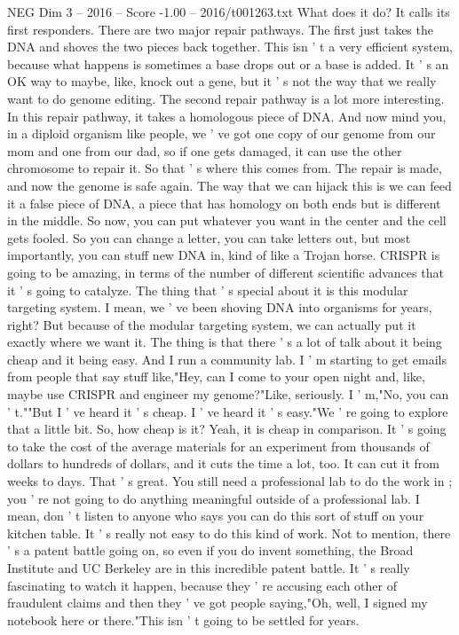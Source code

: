 \begin{textsample}{NEG Dim 3 – 2016 – Score -1.00 – 2016/t001263.txt}
What does it do?
It calls its first responders.
There are two major repair pathways.
The first just takes the DNA and shoves the two pieces back together.
This isn ' t a very efficient system, because what happens is sometimes a base drops out or a base is added.
It ' s an OK way to maybe, like, knock out a gene, but it ' s not the way that we really want to do genome editing.
The second repair pathway is a lot more interesting.
In this repair pathway, it takes a homologous piece of DNA.
And now mind you, in a diploid organism like people, we ' ve got one copy of our genome from our mom and one from our dad, so if one gets damaged, it can use the other chromosome to repair it.
So that ' s where this comes from.
The repair is made, and now the genome is safe again.
The way that we can hijack this is we can feed it a false piece of DNA, a piece that has homology on both ends but is different in the middle.
So now, you can put whatever you want in the center and the cell gets fooled.
So you can change a letter, you can take letters out, but most importantly, you can stuff new DNA in, kind of like a Trojan horse.
CRISPR is going to be amazing, in terms of the number of different scientific advances that it ' s going to catalyze.
The thing that ' s special about it is this modular targeting system.
I mean, we ' ve been shoving DNA into organisms for years, right?
But because of the modular targeting system, we can actually put it exactly where we want it.
The thing is that there ' s a lot of talk about it being cheap and it being easy.
And I run a community lab.
I ' m starting to get emails from people that say stuff like,"Hey, can I come to your open night and, like, maybe use CRISPR and engineer my genome?"Like, seriously.
I ' m,"No, you can ' t.""But I ' ve heard it ' s cheap.
I ' ve heard it ' s easy."We ' re going to explore that a little bit.
So, how cheap is it?
Yeah, it is cheap in comparison.
It ' s going to take the cost of the average materials for an experiment from thousands of dollars to hundreds of dollars, and it cuts the time a lot, too.
It can cut it from weeks to days.
That ' s great.
You still need a professional lab to do the work in ; you ' re not going to do anything meaningful outside of a professional lab.
I mean, don ' t listen to anyone who says you can do this sort of stuff on your kitchen table.
It ' s really not easy to do this kind of work.
Not to mention, there ' s a patent battle going on, so even if you do invent something, the Broad Institute and UC Berkeley are in this incredible patent battle.
It ' s really fascinating to watch it happen, because they ' re accusing each other of fraudulent claims and then they ' ve got people saying,"Oh, well, I signed my notebook here or there."This isn ' t going to be settled for years.

\end{textsample}
